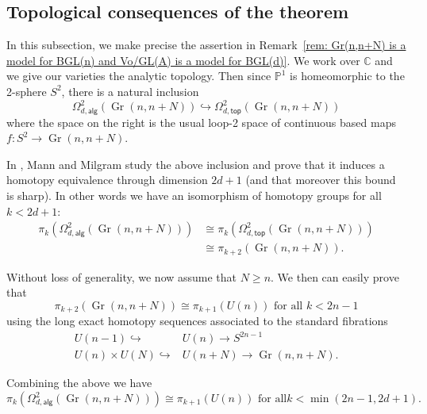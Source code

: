 \documentclass{amsart}
\theoremstyle{definition}
\newcommand{\CC} {{\mathbb C}}          %
\newcommand{\PP}{\mathbb{P}}
\newcommand{\alg}{\mathsf{alg}}
\renewcommand{\top}{\mathsf{top}}
\newcommand{\Gr}{\operatorname{Gr}}
\newcommand{\LoopTwo}{\Omega^{2}_{d,\alg}}
\newcommand{\LoopTwoTop}{\Omega^{2}_{d,\top}}
\begin{document}
\subsection{Topological consequences of the theorem}\label{subsec:
topological consequences}

In this subsection, we make precise the assertion in Remark~\ref{rem:
Gr(n,n+N) is a model for BGL(n) and Vo/GL(A) is a model for
BGL(d)}. We work over $\CC$ and we give our varieties the analytic
topology. Then since $\PP^{1}$ is homeomorphic to the 2-sphere
$S^{2}$, there is a natural inclusion
\[
\LoopTwo (\Gr (n,n+N))\hookrightarrow \LoopTwoTop  (\Gr (n,n+N))
\]
where the space on the right is the usual loop-2 space of continuous
based maps $f:S^{2}\to \Gr (n,n+N)$.

In \cite{Mann-Milgram-93}, Mann and Milgram study the above inclusion
and prove that it induces a homotopy equivalence through dimension
$2d+1$ (and that moreover this bound is sharp). In other words we have
an isomorphism of homotopy groups for all $k<2d+1$:
\begin{align*}
\pi_{k}(\LoopTwo (\Gr (n,n+N))) &\cong \pi_{k}(\LoopTwoTop (\Gr (n,n+N)))\\
&\cong \pi_{k+2}(\Gr (n,n+N)).
\end{align*}

Without loss of generality, we now assume that $N\geq n$. We then can
easily prove that 
\[
\pi_{k+2}(\Gr (n,n+N))\cong \pi_{k+1}(U(n)) \text{ for all $k<2n-1$}
\]
using the long exact homotopy sequences associated to the standard
fibrations 
\begin{align*}
U(n-1)\hookrightarrow &U(n) \to S^{2n-1}\\
U(n)\times U(N) \hookrightarrow & U(n+N)  \to \Gr (n,n+N).
\end{align*}

Combining the above we have
\begin{equation}\label{eqn: pik(loop2alg)=pik+1(U(n))}
\pi_{k}(\LoopTwo (\Gr (n,n+N))) \cong \pi_{k+1}(U(n)) \text{  for all
} k<\min (2n-1,2d+1).
\end{equation}
\end{document}

